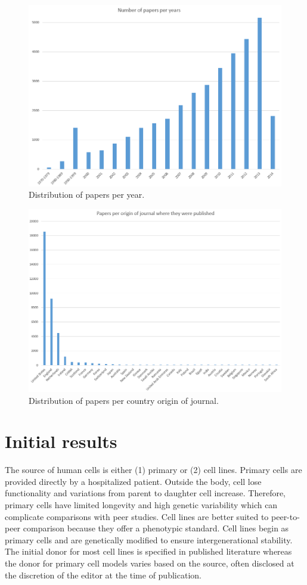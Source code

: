 \documentclass[10pt]{article}
\begin{document}
\begin{figure}[b!]
\centering
\includegraphics[width=0.98\columnwidth]{Figures/Figure1.png}
\caption{\label{dist1}Distribution of papers per year.}
\end{figure}

\begin{figure}[h!]
\centering
\includegraphics[width=0.98\columnwidth]{Figures/Figure2.png}
\caption{\label{dist2}Distribution of papers per country origin of journal.}
\end{figure}

\section{Initial results}
The source of human cells is either (1) primary or (2) cell lines. Primary cells are provided directly by a hospitalized patient. Outside the body, cell lose functionality and variations from parent to daughter cell increase. Therefore, primary cells have limited longevity and high genetic variability which can complicate comparisons with peer studies. Cell lines are better suited to peer-to-peer comparison because they offer a phenotypic standard. Cell lines begin as primary cells and are genetically modified to ensure intergenerational stability. The initial donor for most cell lines is specified in published literature whereas the donor for primary cell models varies based on the source, often disclosed at the discretion of the editor at the time of publication.
\end{document}
